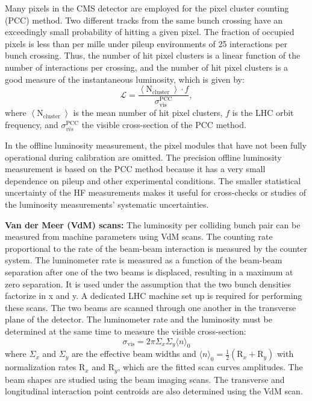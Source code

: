 Many pixels in the CMS detector are employed for the pixel cluster counting (PCC) method. Two different tracks from the same bunch crossing have an exceedingly small probability of hitting a given pixel. The fraction of occupied pixels is less than per mille under pileup environments of 25 interactions per bunch crossing. Thus, the number of hit pixel clusters is a linear function of the number of interactions per crossing, and the number of hit pixel clusters is a good measure of the instantaneous luminosity, which is given by:
%
\begin{equation}
  \mathcal{L}=\frac{\left\langle\text{N}_{\text {cluster }}\right\rangle \cdot f}{\sigma_{\text{vis}}^{\text{PCC}}},
\end{equation}
%
where $\left\langle\text{N}_{\text {cluster }}\right\rangle$ is the mean number of hit pixel clusters, $f$ is the LHC orbit frequency, and $\sigma_{vis}^{\text{PCC}}$ the visible cross-section of the PCC method.

In the offline luminosity measurement, the pixel modules that have not been fully operational during calibration are omitted. The precision offline luminosity measurement is based on the PCC method because it has a very small dependence on pileup and other experimental conditions. The smaller statistical uncertainty of the HF measurements makes it useful for cross-checks or studies of the luminosity measurements' systematic uncertainties.

\textbf{Van der Meer (VdM) scans:} The luminosity per colliding bunch pair can be measured from machine parameters using VdM scans. The counting rate proportional to the rate of the beam-beam interaction is measured by the counter system. The luminometer rate is measured as a function of the beam-beam separation after one of the two beams is displaced, resulting in a maximum at zero separation. It is used under the assumption that the two bunch densities factorize in x and y. A dedicated LHC machine set up is required for performing these scans. The two beams are scanned through one another in the transverse plane of the detector. The luminometer rate and the luminosity must be determined at the same time to measure the visible cross-section:
%
\begin{equation}
  \sigma_{\text{vis}}=2 \pi \Sigma_{x} \Sigma_{y}\langle n\rangle_{0}
\end{equation}
%
where $\Sigma_{x}$ and $\Sigma_{y}$ are the effective beam widths and $\langle n\rangle_{0}=\frac{1}{2}\left(\text{R}_{x}+\text{R}_{y}\right)$ with normalization rates $\text{R}_x$ and $\text{R}_y$, which are the fitted scan curves amplitudes. The beam shapes are studied using the beam imaging scans. The transverse and longitudinal interaction point centroids are also determined using the VdM scan.

